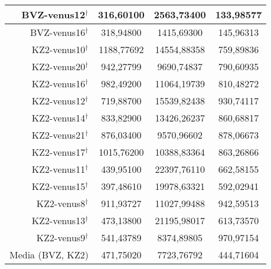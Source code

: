 \documentclass{article}
\begin{document}
\begin{table}
{\begin{tabular}{|r|c|c|c|}
        BVZ-venus12$^\dagger$ & 316,60100 & 2563,73400 & 133,98577 \\ \hline
        BVZ-venus16$^\dagger$ & 318,94800 & 1415,69300 & 145,96313 \\ \hline
        KZ2-venus10$^\dagger$ & 1188,77692 & 14554,88358 & 759,89836 \\ \hline
        KZ2-venus20$^\dagger$ & 942,27799 & 9690,74837 & 790,60935 \\ \hline
        KZ2-venus16$^\dagger$ & 982,49200 & 11064,19739 & 810,48272 \\ \hline
        KZ2-venus12$^\dagger$ & 719,88700 & 15539,82438 & 930,74117 \\ \hline
        KZ2-venus14$^\dagger$ & 833,82900 & 13426,26237 & 860,68817 \\ \hline
        KZ2-venus21$^\dagger$ & 876,03400 & 9570,96602 & 878,06673 \\ \hline
        KZ2-venus17$^\dagger$ & 1015,76200 & 10388,83364 & 863,26866 \\ \hline
        KZ2-venus11$^\dagger$ & 439,95100 & 22397,76110 & 662,58155 \\ \hline
        KZ2-venus15$^\dagger$ & 397,48610 & 19978,63321 & 592,02941 \\ \hline
        KZ2-venus8$^\dagger$ & 911,93727 & 11027,99488 & 942,59513 \\ \hline
        KZ2-venus13$^\dagger$ & 473,13800 & 21195,98017 & 613,73570 \\ \hline
        KZ2-venus9$^\dagger$ & 541,43789 & 8374,89805 & 970,97154 \\ \hline\hline
        Media (BVZ, KZ2) & 471,75020 & 7723,76792 & 444,71604 \\ \hline
    \end{tabular}}
\end{table}
\end{document}
